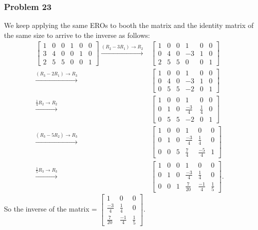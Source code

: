 \documentclass[a4paper,12pt]{article}
\begin{document}
\subsubsection*{Problem 23}
We keep applying the same EROs to booth the matrix and the identity matrix of the same size to arrive to the inverse as follows: 
\begin{align*}
    \left [
\begin{array}{ccc|ccc}
  1 & 0 & 0 & 1 & 0 & 0\\
  3 & 4 & 0 & 0 & 1 & 0\\
  2 & 5 & 5 & 0 & 0 & 1
\end{array} \right ] \xrightarrow{{(R_2-3R_1)}\to{R_2}}
&\left [
\begin{array}{ccc|ccc}
  1 & 0 & 0 & 1 & 0 & 0\\
  0 & 4 & 0 & -3 & 1 & 0\\
  2 & 5 & 5 & 0 & 0 & 1
\end{array} \right ]\\ \xrightarrow{{(R_3-2R_1)}\to{R_3}}
&\left [
\begin{array}{ccc|ccc}
  1 & 0 & 0 & 1 & 0 & 0\\
  0& 4 & 0 & -3 & 1 & 0\\
  0 & 5 & 5 & -2 & 0 & 1
\end{array} \right ] \\ \xrightarrow{{\frac{1}{4}R_2}\to{R_2}}
&\left [
\begin{array}{ccc|ccc}
  1 & 0 & 0 & 1 & 0 & 0\\
  0& 1 & 0 & \frac{-3}{4} & \frac{1}{4} & 0\\
  0 & 5 & 5 & -2 & 0 & 1
\end{array} \right ] \\ \xrightarrow{{(R_3-5R_2)}	\to{R_3}}
&\left [
\begin{array}{ccc|ccc}
  1 & 0 & 0 & 1 & 0 & 0\\
  0& 1 & 0 & \frac{-3}{4} & \frac{1}{4} & 0\\
  0 & 0 & 5 & \frac{7}{4} & \frac{-5}{4} & 1
\end{array} \right ]\\ \xrightarrow{{\frac{1}{5}R_3}\to{R_3}}
&\left [
\begin{array}{ccc|ccc}
  1 & 0 & 0 & 1 & 0 & 0\\
  0& 1 & 0 & \frac{-3}{4} & \frac{1}{4} & 0\\
  0 & 0 & 1 & \frac{7}{20} & \frac{-1}{4} & \frac{1}{5}
\end{array} \right ].
\end{align*}
So the inverse of the matrix = $\begin{bmatrix}
    1 & 0 & 0 \\
    \frac{-3}{4} & \frac{1}{4} & 0 \\
    \frac{7}{20} & \frac{-1}{4} & \frac{1}{5}
  \end{bmatrix}.$
\end{document}

